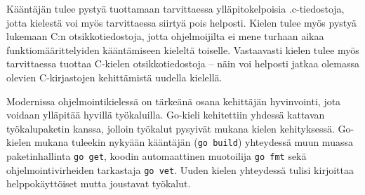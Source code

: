 
Kääntäjän tulee pystyä tuottamaan tarvittaessa ylläpitokelpoisia .c-tiedostoja,
jotta kielestä voi myös tarvittaessa siirtyä pois helposti.  Kielen tulee myös
pystyä lukemaan C:n otsikkotiedostoja, jotta ohjelmoijilta ei mene turhaan
aikaa funktiomäärittelyiden kääntämiseen kieleltä toiselle. Vastaavasti kielen
tulee myös tarvittaessa tuottaa C-kielen otsikkotiedostoja -- näin voi helposti
jatkaa olemassa olevien C-kirjastojen kehittämistä uudella kielellä.

%

Modernissa ohjelmointikielessä on tärkeänä osana kehittäjän hyvinvointi, jota
voidaan ylläpitää hyvillä työkaluilla. Go-kieli kehitettiin yhdessä kattavan
työkalupaketin kanssa, jolloin työkalut pysyivät mukana kielen kehityksessä.
Go-kielen mukana tuleekin nykyään kääntäjän (\texttt{go build}) yhteydessä muun
muassa paketinhallinta \texttt{go get}, koodin automaattinen muotoilija
\texttt{go fmt} sekä ohjelmointivirheiden tarkastaja \texttt{go vet}. Uuden
kielen yhteydessä tulisi kirjoittaa helppokäyttöiset mutta joustavat työkalut.




%
